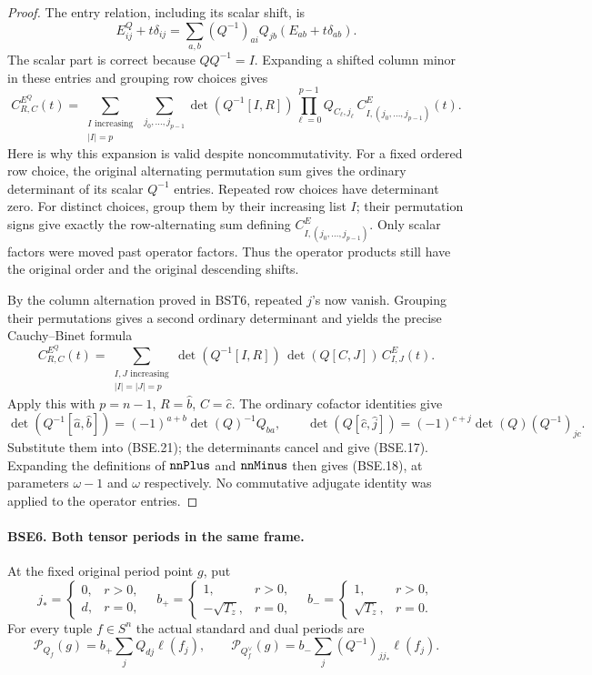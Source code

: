 \documentclass[11pt,a4paper]{article}
\numberwithin{equation}{section}
\theoremstyle{remark}\newtheorem{remark}[theorem]{Remark}
\begin{document}
\begin{proof}
The entry relation, including its scalar shift, is
\[
 E^Q_{ij}+t\delta_{ij}
    =\sum_{a,b}(Q^{-1})_{ai}Q_{jb}
                                      (E_{ab}+t\delta_{ab}).
 \tag{BSE.19}
\]
The scalar part is correct because $QQ^{-1}=I$.
Expanding a shifted column minor in these entries and grouping
row choices gives
\[
 C^{E^Q}_{R,C}(t)
 =\sum_{\substack{I\text{ increasing}\\ |I|=p}}
   \ \sum_{j_0,\ldots,j_{p-1}}
       \det(Q^{-1}[I,R])
       \prod_{\ell=0}^{p-1}Q_{C_\ell,j_\ell}\,
                             C^E_{I,(j_0,\ldots,j_{p-1})}(t).
 \tag{BSE.20}
\]
Here is why this expansion is valid despite noncommutativity.
For a fixed ordered row choice, the original alternating
permutation sum gives the ordinary determinant of its scalar
$Q^{-1}$ entries.  Repeated row choices have determinant zero.
For distinct choices, group them by their increasing list $I$;
their permutation signs give exactly the row-alternating sum
defining $C^E_{I,(j_0,\ldots,j_{p-1})}$.
Only scalar factors were moved past operator factors.
Thus the operator products still have the original order and
the original descending shifts.

By the column alternation proved in BST6, repeated $j$'s now
vanish.  Grouping their permutations gives a second ordinary
determinant and yields the precise Cauchy--Binet formula
\[
 C^{E^Q}_{R,C}(t)
    =\sum_{\substack{I,J\text{ increasing}\\|I|=|J|=p}}
       \det(Q^{-1}[I,R])\,\det(Q[C,J])\,C^E_{I,J}(t).
 \tag{BSE.21}
\]
Apply this with $p=n-1$, $R=\widehat b$, $C=\widehat c$.
The ordinary cofactor identities give
\[
 \det(Q^{-1}[\widehat a,\widehat b])
      =(-1)^{a+b}\det(Q)^{-1}Q_{ba},\qquad
 \det(Q[\widehat c,\widehat j])
      =(-1)^{c+j}\det(Q)(Q^{-1})_{jc}.
 \tag{BSE.22}
\]
Substitute them into (BSE.21); the determinants cancel and give
(BSE.17).  Expanding the definitions of $\texttt{nn\allowbreak Plus}$ and
$\texttt{nn\allowbreak Minus}$ then gives (BSE.18), at parameters
$\omega-1$ and $\omega$ respectively.
No commutative adjugate identity was applied to the operator entries.
\end{proof}

\paragraph{BSE6. Both tensor periods in the same frame.}
\label{claim:BSE6}
At the fixed original period point $g$, put
\[
 j_*=\begin{cases}0,&r>0,\\d,&r=0,\end{cases}
 \quad
 b_+=\begin{cases}1,&r>0,\\-\sqrt{T_z},&r=0,\end{cases}
 \quad
 b_-=\begin{cases}1,&r>0,\\\sqrt{T_z},&r=0.\end{cases}
 \tag{BSE.23}
\]
For every tuple $f\in S^n$ the actual standard and dual periods are
\[
 \mathcal P_{Q_f}(g)=b_+\sum_jQ_{dj}\ell(f_j),\qquad
 \mathcal P_{Q_f^\vee}(g)=b_-\sum_j(Q^{-1})_{jj_*}\ell(f_j).
 \tag{BSE.24}
\]
\end{document}
